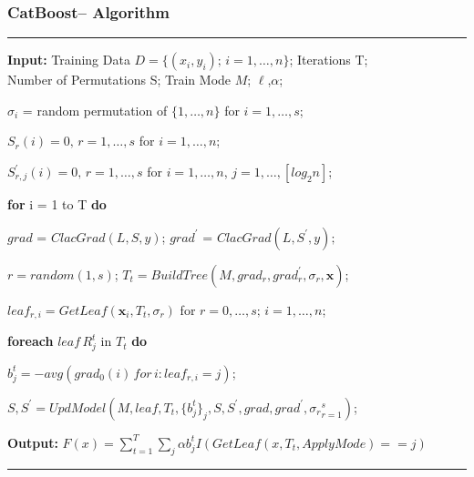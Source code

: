 \documentclass[usenames,dvipsnames]{beamer}
\begin{document}
\begin{frame}
\frametitle{CatBoost-- Algorithm}
\noindent\rule[0.10\baselineskip]{\textwidth}{0.75pt}
\textbf{Input:} Training Data $D=\{(x_i,y_i);\, i = 1,\dots, n\}$; Iterations T;\\ 
    \hspace*{32pt} Number of Permutations S; Train Mode $M$; $\ell$,$\alpha$;\par
    \hspace*{12pt} $\sigma_i$ = random permutation of $\{1,\dots,n\}$ for $i=1,\dots,s$;\par
    \hspace*{12pt} $S_r(i) = 0,\,r = 1,\dots,s$ for $i=1,\dots,n$;\par
    \hspace*{12pt} $S_{r,j}^{'}(i) = 0,\,r = 1,\dots,s$ for $i=1,\dots,n$, $j = 1, \dots, [log_2n]$;\par
    \hspace*{12pt} \textbf{for} i = 1 to T \textbf{do}\par
    \hspace*{28pt} $grad$ = $ClacGrad(L, S, y)$; $grad^{'}$ = $ClacGrad(L, S^{'}, y);$\par
    \hspace*{28pt} $r = random(1,s)$; $T_t = BuildTree(M, grad_r, grad_r^{'},\sigma_r, \textbf{x})$;\par
    \hspace*{28pt} $leaf_{r,i} = GetLeaf(\textbf{x}_i,T_t, \sigma_r)$ for $r = 0, \dots, s;\,i = 1, \dots, n$;\par
    \hspace*{28pt} \textbf{foreach} $leaf\,R_j^t$ in $T_t$ \textbf{do}\par
    \hspace*{44pt} $b_j^t = -avg(grad_0(i)\,for\,i:leaf_{r,i} = j)$;\par
    \hspace*{28pt} $S, S^{'} = UpdModel(M, leaf, T_t, \{b_j^t\}_j, S, S^{'},grad, grad^{'}, {\sigma_r}_{r=1}^{s})$;\par
\textbf{Output:} $F(x) = \sum_{t=1}^{T}\sum_{j}\alpha b_j^t I(GetLeaf(x, T_t, ApplyMode)==j)$\par
\noindent\rule[0.10\baselineskip]{\textwidth}{0.75pt}
\end{frame}
\end{document}
